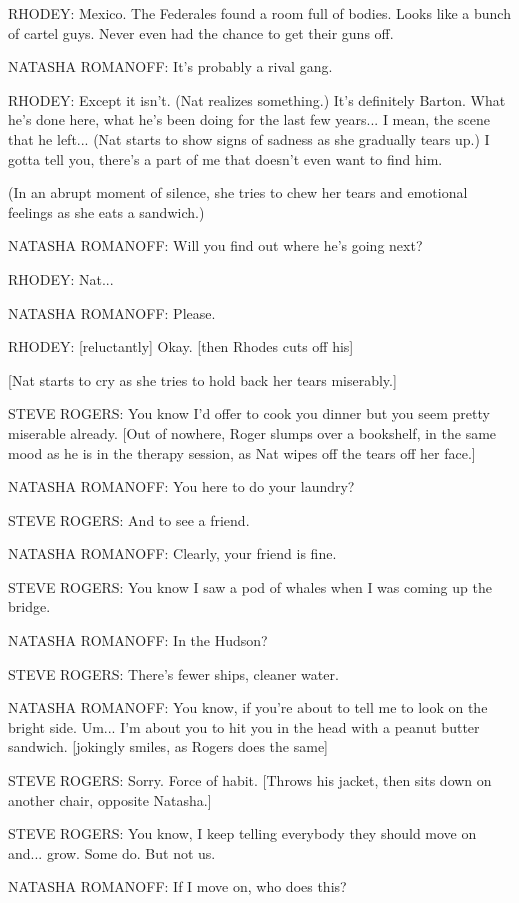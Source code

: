 RHODEY: Mexico. The Federales found a room full of bodies. Looks like a bunch of cartel guys. Never even had the chance to get their guns off.

NATASHA ROMANOFF: It's probably a rival gang.

RHODEY: Except it isn't. (Nat realizes something.) It's definitely Barton. What he's done here, what he's been doing for the last few years... I mean, the scene that he left... (Nat starts to show signs of sadness as she gradually tears up.) I gotta tell you, there's a part of me that doesn't even want to find him.

(In an abrupt moment of silence, she tries to chew her tears and emotional feelings as she eats a sandwich.)

NATASHA ROMANOFF: Will you find out where he's going next?

RHODEY: Nat...

NATASHA ROMANOFF: Please.

RHODEY: [reluctantly] Okay. [then Rhodes cuts off his]

[Nat starts to cry as she tries to hold back her tears miserably.]

STEVE ROGERS: You know I'd offer to cook you dinner but you seem pretty miserable already. [Out of nowhere, Roger slumps over a bookshelf, in the same mood as he is in the therapy session, as Nat wipes off the tears off her face.]

NATASHA ROMANOFF: You here to do your laundry?

STEVE ROGERS: And to see a friend.

NATASHA ROMANOFF: Clearly, your friend is fine.

STEVE ROGERS: You know I saw a pod of whales when I was coming up the bridge.

NATASHA ROMANOFF: In the Hudson?

STEVE ROGERS: There's fewer ships, cleaner water.

NATASHA ROMANOFF: You know, if you're about to tell me to look on the bright side. Um... I'm about you to hit you in the head with a peanut butter sandwich. [jokingly smiles, as Rogers does the same]

STEVE ROGERS: Sorry. Force of habit. [Throws his jacket, then sits down on another chair, opposite Natasha.]

STEVE ROGERS: You know, I keep telling everybody they should move on and... grow. Some do. But not us.

NATASHA ROMANOFF: If I move on, who does this?


